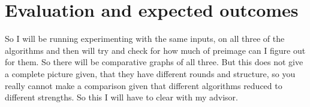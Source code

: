\chapter{Evaluation and expected outcomes}

So I will be running experimenting with the same inputs, on all three of the algorithms and then will try and check for 
how much of preimage can I figure out for them. So there will be comparative graphs of all three. But this does not give
a complete picture given, that they have different rounds and structure, so you really cannot make a comparison given
that different algorithms reduced to different strengths. So this I will have to clear with my advisor.



